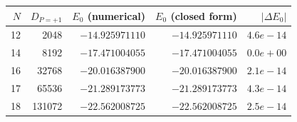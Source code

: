 \begin{tabular}{rrrrr}
\toprule
$N$ & $D_{P=+1}$ & $E_0$ (numerical) & $E_0$ (closed form) & $|\Delta E_0|$ \\
\midrule
12 & 2048 & $-14.925971110$ & $-14.925971110$ & $4.6e-14$ \\
14 & 8192 & $-17.471004055$ & $-17.471004055$ & $0.0e+00$ \\
16 & 32768 & $-20.016387900$ & $-20.016387900$ & $2.1e-14$ \\
17 & 65536 & $-21.289173773$ & $-21.289173773$ & $4.3e-14$ \\
18 & 131072 & $-22.562008725$ & $-22.562008725$ & $2.5e-14$ \\
\bottomrule
\end{tabular}
